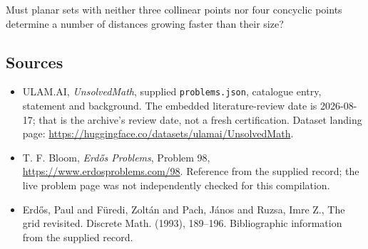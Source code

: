 \documentclass[11pt,a4paper]{article}
\begin{document}
Must planar sets with neither three collinear points nor four concyclic points determine a number of distances growing faster than their size?

\subsection{Sources}

{\small

\begin{itemize}

\item[\hypertarget{source:statement:1}{S1}] ULAM.AI, \emph{UnsolvedMath}, supplied \texttt{problems.json}, catalogue entry, statement and background. The embedded literature-review date is 2026-08-17; that is the archive’s review date, not a fresh certification. Dataset landing page: \url{https://huggingface.co/datasets/ulamai/UnsolvedMath}.

\item[\hypertarget{source:statement:2}{S2}] T. F. Bloom, \emph{Erdős Problems}, Problem 98, \url{https://www.erdosproblems.com/98}. Reference from the supplied record; the live problem page was not independently checked for this compilation.

\item[\hypertarget{source:statement:3}{S3}] Erd\H{o}s, Paul and F\"{u}redi, Zolt\'{a}n and Pach, J\'{a}nos and Ruzsa, Imre Z., The grid revisited. Discrete Math. (1993), 189--196. Bibliographic information from the supplied record.

\end{itemize}

}

\label{end:statement}
\end{document}
